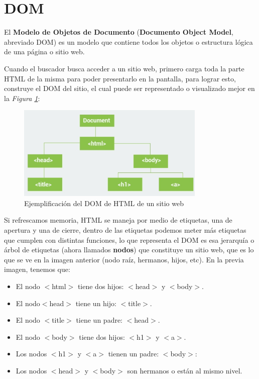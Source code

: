 \section{DOM}

El \textbf{Modelo de Objetos de Documento} (\textbf{Documento Object Model}, abreviado DOM) es un modelo que contiene todos los objetos o estructura lógica de una página o sitio web.

Cuando el buscador busca acceder a un sitio web, primero carga toda la parte HTML de la misma para poder presentarlo en la pantalla, para lograr esto, construye el DOM del sitio, el cual puede ser representado o visualizado mejor en la \textit{Figura \ref{fig: 5}}:
\begin{figure}[H]
    \caption{Ejemplificación del DOM de HTML de un sitio web}
    \label{fig: 5}
    \begin{center}
        \includegraphics [width=9cm]{ss/dom_html.png}
    \end{center}
\end{figure}

Si refrescamos memoria, HTML se maneja por medio de etiquetas, una de apertura y una de cierre, dentro de las etiquetas podemos meter más etiquetas que cumplen con distintas funciones, lo que representa el DOM es esa jerarquía o árbol de etiquetas (ahora llamados \textbf{nodos}) que constituye un sitio web, que es lo que se ve en la imagen anterior (nodo raíz, hermanos, hijos, etc). En la previa imagen, tenemos que:
\begin{itemize}
    \item El nodo $<$html$>$ tiene dos hijos: $<$head$>$ y $<$body$>$.
    \item El nodo$<$head$>$ tiene un hijo: $<$title$>$.
    \item El nodo $<$title$>$ tiene un padre: $<$head$>$.
    \item El nodo $<$body$>$ tiene dos hijos: $<$h1$>$ y $<$a$>$.
    \item Los nodos $<$h1$>$ y $<$a$>$ tienen un padre: $<$body$>$:
    \item Los nodos $<$head$>$ y $<$body$>$ son hermanos o están al mismo nivel.
\end{itemize}

